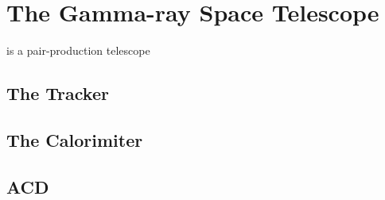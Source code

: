 \section{The \fermi Gamma-ray Space Telescope}

 is a pair-production telescope

\subsection{The Tracker}
\subsection{The Calorimiter}
\subsection{\acf{ACD}}

\subsection{}

